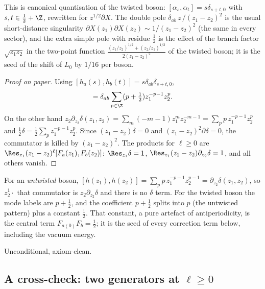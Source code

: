 \begin{physics}
This is canonical quantisation of the twisted boson: $[\alpha_s,\alpha_t]=s\delta_{s+t,0}$ with $s,t\in\tfrac12+\Z$, rewritten for $z^{1/2}\partial X$. The double pole $\delta_{ab}\,z\,/(z_1-z_2)^2$ is the usual short-distance singularity $\partial X(z_1)\partial X(z_2)\sim1/(z_1-z_2)^2$ (the same in every sector), and the extra simple pole with residue $\tfrac12$ is the effect of the branch factor $\sqrt{z_1z_2}$ in the two-point function $\frac{(z_1/z_2)^{1/2}+(z_2/z_1)^{1/2}}{2(z_1-z_2)^2}$ of the twisted boson; it is the seed of the shift of $L_0$ by $1/16$ per boson.
\end{physics}

\begin{proof}[Proof on paper]
Using $[h_a(s),h_b(t)] = s\delta_{ab}\delta_{s+t,0}$,
\begin{equation*}
  [F_a(z_1),F_b(z_2)] = \delta_{ab}\sum_{p\in\Z}(p+\tfrac12)z_1^{-p-1}z_2^{p}.
\end{equation*}
On the other hand $z_2\partial_{z_2}\delta(z_1,z_2) = \sum_m(-m-1)z_1^mz_2^{-m-1} =
\sum_p p\,z_1^{-p-1}z_2^{p}$ and $\frac12\delta = \frac12\sum_pz_1^{-p-1}z_2^p$. Since
$(z_1-z_2)\delta = 0$ and $(z_1-z_2)^2\partial\delta = 0$, the commutator is killed by
$(z_1-z_2)^2$. The products for $\ell\ge0$ are $\Res_{z_1}(z_1-z_2)^\ell[F_a(z_1),F_b(z_2)]$:
$\Res_{z_1}\delta = 1$, $\Res_{z_1}(z_1-z_2)\partial_{z_2}\delta = 1$, and all others vanish.
\end{proof}

\begin{remark}
For an \emph{untwisted} boson, $[h(z_1),h(z_2)] = \sum_p p\,z_1^{-p-1}z_2^{p-1} =
\partial_{z_2}\delta(z_1,z_2)$, so $z_2^{1}\cdot$ that commutator is $z_2\partial_{z_2}\delta$
and there is no $\delta$ term. For the twisted boson the mode labels are $p+\frac12$, and the
coefficient $p+\frac12$ splits into $p$ (the untwisted pattern) plus a constant $\frac12$. That
constant, a pure artefact of antiperiodicity, is the central term $F_{a(0)}F_b = \frac12$; it is
the seed of every correction term below, including the vacuum energy.
\end{remark}

\begin{status}
Unconditional, axiom-clean.
\end{status}

\subsection{A cross-check: two generators at \texorpdfstring{$\ell\ge0$}{l>=0}}
\label{ch07:sec:gencheck}

